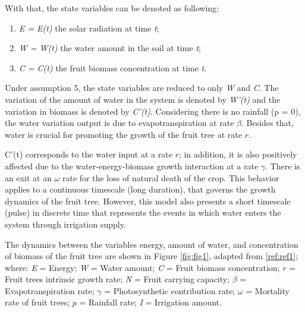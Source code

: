 \documentclass[
]{article}
\providecommand{\tightlist}{%
  \setlength{\itemsep}{0pt}\setlength{\parskip}{0pt}}
\begin{document}
With that, the state variables can be denoted as following:

\begin{enumerate}
\def\labelenumi{\arabic{enumi}.}
\tightlist
\item
  \emph{E = E(t)} the solar radiation at time \emph{t};
\item
  \emph{W = W(t)} the water amount in the soil at time \emph{t};
\item
  \emph{C = C(t)} the fruit biomass concentration at time \emph{t}.
\end{enumerate}

Under assumption 5, the state variables are reduced to only \emph{W} and
\emph{C}. The variation of the amount of water in the system is denoted
by \emph{W'(t)} and the variation in biomass is denoted by \emph{C'(t)}.
Considering there is no rainfall (p = 0), the water variation output is
due to evapotranspiration at rate \(\beta\). Besides that, water is
crucial for promoting the growth of the fruit tree at rate \(r\).

C'(t) corresponds to the water input at a rate \(r\); in addition, it is
also positively affected due to the water-energy-biomass growth
interaction at a rate \(\gamma\). There is an exit at an \(\omega\) rate
for the loss of natural death of the crop. This behavior applies to a
continuous timescale (long duration), that governs the growth dynamics
of the fruit tree. However, this model also presents a short timescale
(pulse) in discrete time that represents the events in which water
enters the system through irrigation supply.

The dynamics between the variables energy, amount of water, and
concentration of biomass of the fruit tree are shown in Figure
\ref{fig:fig1}, adapted from \ref{ref:ref1}; where: \emph{E} = Energy;
\emph{W} = Water amount; \emph{C} = Fruit biomass concentration; \(r\) =
Fruit trees intrinsic growth rate; \emph{N} = Fruit carrying capacity;
\(\beta\) = Evapotranspiration rate; \(\gamma\) = Photosynthetic
contribution rate; \(\omega\) = Mortality rate of fruit trees; \(p\) =
Rainfall rate; \emph{I} = Irrigation amount.\newline
\end{document}
